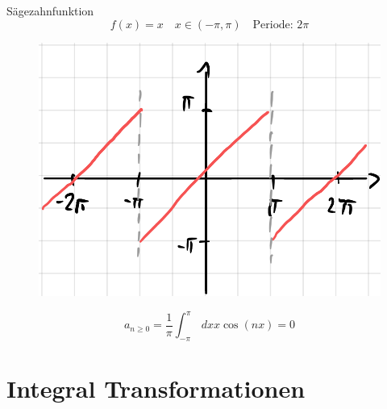 \documentclass{physikprotokoll}
\begin{document}
	\begin{Bsp}{Sägezahnfunktion}
		$$f(x)=x \quad x \in (-\pi,\pi) \quad \textrm{Periode: } 2\pi$$
		\begin{figure}[H]
			\centering
			\includegraphics[width=0.4\linewidth]{Grafiken/Fourierreihen/Grafik3.PNG}
		\end{figure}

		$$a_{n \geq 0} = \frac{1}{\pi} \int_{-\pi}^{\pi} \,dx x \cos(nx) = 0$$

	\end{Bsp}

	\newpage
	\section{Integral Transformationen}
	\newpage


	\listoftables
	\listoffigures
\end{document}
